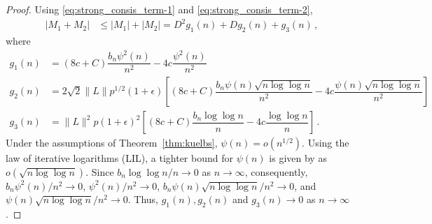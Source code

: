 \documentclass[12pt]{article}
\newtheorem{lemma}{Lemma}
\theoremstyle{remark}
\begin{document}
\begin{proof}
%
Using \eqref{eq:strong_consis_term-1} and \eqref{eq:strong_consis_term-2},
\begin{align*}
|M_1 + M_2|  & \leq |M_1| + |M_2|
   = D^2g_1(n) + D g_2(n) + g_3(n)\,,
\end{align*}
where
\begin{align*}
    g_1(n) &= (8c + C)\dfrac{b_n \psi^2(n)}{n^2} - 4c\dfrac{\psi^2(n)}{n^2}\\
    g_2(n) &= 2\sqrt{2}\|L\|p^{1/2}(1+\epsilon)\left[(8c + C)\dfrac{b_n\psi(n)\sqrt{n\log \log n}}{n^2} - 4c\dfrac{\psi(n)\sqrt{n\log \log n}}{n^2}\right]\\
    g_3(n) &= \|L\|^2 p (1+\epsilon)^2\left[(8c + C)\dfrac{b_n \log\log n}{n} - 4c \dfrac{\log \log n}{n}\right]\,.
\end{align*}
Under the assumptions of Theorem~\ref{thm:kuelbs}, $\psi(n) = o(n^{1/2})$. Using the law of iterative logarithms (LIL), a tighter bound for $\psi(n)$ is given by \cite{stra:1964} as $o(\sqrt{n\log \log n})$. Since $b_n \log \log n / n \to 0$ as $n \to \infty$, consequently, 
$b_n \psi^2(n)/n^2 \to 0$, $\psi^2(n)/n^2 \to 0$, ${b_n\psi(n)\sqrt{n\log \log n}/n^2} \to 0$, and $\psi(n) \sqrt{n \log \log n}/n^2 \to 0$. Thus, $g_1(n), g_2(n)$ and $g_3(n) \to 0$ as $n \to \infty$.
\end{proof}
%
\end{document}
